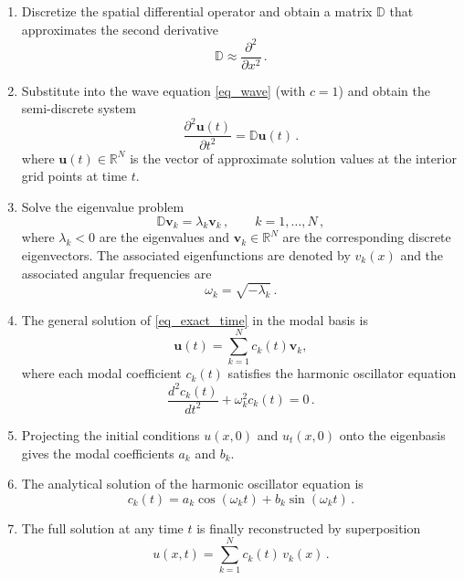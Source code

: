 \documentclass[11pt,a4paper,oneside,openright]{report} %
\begin{document}
\begin{enumerate}
    \item Discretize the spatial differential operator and obtain a matrix $\mathbb{D}$ that approximates the second derivative
    \begin{equation}
        \mathbb{D} \approx \frac{\partial^2}{\partial x^2} \, .
    \end{equation}

    \item Substitute into the wave equation \eqref{eq_wave} (with $c=1$) and obtain the semi-discrete system
    \begin{equation}\label{eq_exact_time}
        \frac{\partial^2 \boldsymbol{u}(t)}{\partial t^2} = \mathbb{D} \boldsymbol{u}(t) \, .
    \end{equation}
    where $\boldsymbol{u}(t) \in \mathbb{R}^N$ is the vector of approximate solution values at the interior grid points at time $t$.

    \item Solve the eigenvalue problem
    \begin{equation}
        \mathbb{D} \boldsymbol{v}_k = \lambda_k \boldsymbol{v}_k \, , \qquad k=1,\dots,N \, ,
    \end{equation}
    where $\lambda_k < 0$ are the eigenvalues and $\boldsymbol{v}_k \in \mathbb{R}^N$ are the corresponding discrete eigenvectors. The associated eigenfunctions are denoted by $v_k(x)$ and the associated angular frequencies are
    \begin{equation}\label{omega}
        \omega_k = \sqrt{-\lambda_k} \, .
    \end{equation}

    \item The general solution of \eqref{eq_exact_time} in the modal basis is
    \begin{equation}
        \boldsymbol{u}(t) = \sum_{k=1}^N c_k(t) \boldsymbol{v}_k,
    \end{equation}
    where each modal coefficient $c_k(t)$ satisfies the harmonic oscillator equation
    \begin{equation}
        \frac{d^2 c_k(t)}{dt^2} + \omega_k^2 c_k(t) = 0 \, .
    \end{equation}

    \item Projecting the initial conditions $u(x,0)$ and $u_t(x,0)$ onto the eigenbasis gives the modal coefficients $a_k$ and $b_k$.

    \item The analytical solution of the harmonic oscillator equation is
    \begin{equation}
        c_k(t) = a_k \cos(\omega_k t) + b_k \sin(\omega_k t) \, .
    \end{equation}

    \item The full solution at any time $t$ is finally reconstructed by superposition
    \begin{equation}
        u(x,t) = \sum_{k=1}^N c_k(t) \, v_k(x) \, .
    \end{equation}
\end{enumerate}
\end{document}
